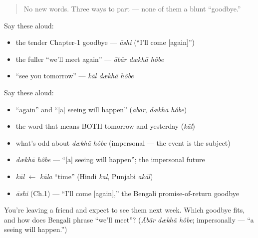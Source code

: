 \label{lesson:BN-C04-practice}



\begin{quote}
No new words. Three ways to part — none of them a blunt \textquotedblleft{}goodbye.\textquotedblright{}
\end{quote}

\begin{culture}
Say these aloud:

\begin{itemize}
\raggedright
  \item the tender Chapter-1 goodbye — \emph{āshi} (\textquotedblleft{}I'll come {[}again{]}\textquotedblright{})
  \item the fuller \textquotedblleft{}we'll meet again\textquotedblright{} — \emph{ābār dækhā hôbe}
  \item \textquotedblleft{}see you tomorrow\textquotedblright{} — \emph{kāl dækhā hôbe}
\end{itemize}
\end{culture}

\begin{cousinweb}
Say these aloud:

\begin{itemize}
\raggedright
  \item \textquotedblleft{}again\textquotedblright{} and \textquotedblleft{}{[}a{]} seeing will happen\textquotedblright{} (\emph{ābār}, \emph{dækhā hôbe})
  \item the word that means BOTH tomorrow and yesterday (\emph{kāl})
  \item what's odd about \emph{dækhā hôbe} (impersonal — the event is the subject)
\end{itemize}
\end{cousinweb}

\begin{grammarlens}[title={What you've built — roots you now carry}]
\begin{itemize}
\raggedright
  \item \emph{dækhā hôbe} — \textquotedblleft{}{[}a{]} seeing will happen\textquotedblright{}; the impersonal future
  \item \emph{kāl} $\leftarrow$ \emph{kāla} \textquotedblleft{}time\textquotedblright{} (Hindi \emph{kal}, Punjabi \emph{akāl})
  \item \emph{āshi} (Ch.1) — \textquotedblleft{}I'll come {[}again{]},\textquotedblright{} the Bengali promise-of-return goodbye
\end{itemize}
\end{grammarlens}

\begin{tcolorbox}[breakable,colback=teal!4,colframe=teal!35!black,title={Before you move on}]
You're leaving a friend and expect to see them next week. Which goodbye fits, and how does Bengali phrase \textquotedblleft{}we'll meet\textquotedblright{}? (\emph{Ābār dækhā hôbe}; impersonally — \textquotedblleft{}a seeing will happen.\textquotedblright{})
\end{tcolorbox}
